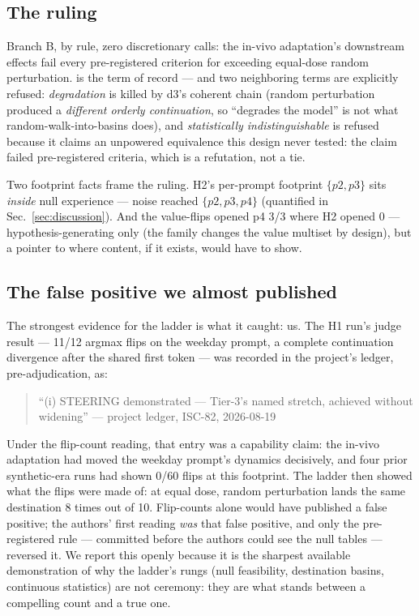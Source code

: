 \subsection{The ruling}
\label{sec:ruling}

Branch B, by rule, zero discretionary calls: the in-vivo
adaptation's downstream effects fail every pre-registered criterion
for exceeding equal-dose random perturbation. \unattrib{} is the term
of record --- and two neighboring terms are explicitly refused:
\emph{degradation} is killed by d3's coherent chain (random
perturbation produced a \emph{different orderly continuation}, so
``degrades the model'' is not what random-walk-into-basins does), and
\emph{statistically indistinguishable} is refused because it claims an
unpowered equivalence this design never tested: the claim failed
pre-registered criteria, which is a refutation, not a tie.

Two footprint facts frame the ruling. H2's per-prompt footprint
$\{p2, p3\}$ sits \emph{inside} null experience --- noise reached
$\{p2, p3, p4\}$ (quantified in Sec.~\ref{sec:discussion}). And the
value-flips opened p4 3/3 where H2 opened 0 --- hypothesis-generating
only (the family changes the value multiset by design), but a pointer
to where content, if it exists, would have to show.

\subsection{The false positive we almost published}
\label{sec:averted}

The strongest evidence for the ladder is what it caught: us. The H1
run's judge result --- 11/12 argmax flips on the weekday prompt, a
complete continuation divergence after the shared first token --- was
recorded in the project's ledger, pre-adjudication, as:

\begin{quote}\small
``(i) STEERING demonstrated --- Tier-3's named stretch, achieved %
without widening'' %
\hfill --- project ledger, ISC-82, 2026-08-19
\end{quote}

Under the flip-count reading, that entry was a capability claim: the
in-vivo adaptation had moved the weekday prompt's dynamics decisively,
and four prior synthetic-era runs had shown 0/60 flips at this
footprint. The ladder then showed what the flips were made of: at
equal dose, random perturbation lands the same destination 8 times out
of 10. Flip-counts alone would have published a false positive; the
authors' first reading \emph{was} that false positive, and only the
pre-registered rule --- committed before the authors could see the
null tables --- reversed it. We report this openly because it is the
sharpest available demonstration of why the ladder's rungs (null
feasibility, destination basins, continuous statistics) are not
ceremony: they are what stands between a compelling count and a true
one.
